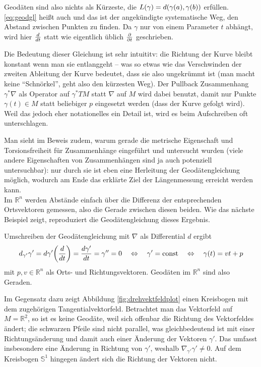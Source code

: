 Geodäten sind also nichts als Kürzeste, die $L(\gamma) = d\qty(\gamma(a), \gamma(b))$ erfüllen. \eqref{eq:geodgl} heißt auch  und das ist der angekündigte systematische Weg, den Abstand zwischen Punkten zu finden. Da $\gamma$ nur von einem Parameter $t$ abhängt, wird hier $\dv{t}$ statt wie eigentlich üblich $\pdv{t}$ geschrieben.

Die Bedeutung dieser Gleichung ist sehr intuititv: die Richtung der Kurve bleibt konstant wenn man sie entlanggeht -- was so etwas wie das Verschwinden der zweiten Ableitung der Kurve bedeutet, dass sie also ungekrümmt ist (man macht keine \enquote{Schnörkel}, geht also den kürzesten Weg). Der Pullback Zusammenhang $\gamma^*\nabla$ als Operator auf $\gamma^* TM$ statt $\nabla$ auf $M$ wird dabei benutzt, damit nur Punkte $\gamma(t) \in M$ statt beliebiger $p$ eingesetzt werden (dass der Kurve gefolgt wird). Weil das jedoch eher notationelles ein Detail ist, wird es beim Aufschreiben oft unterschlagen.

Man sieht im Beweis zudem, warum gerade die metrische Eigenschaft und Torsionsfreiheit für Zusammenhänge eingeführt und untersucht wurden (viele andere Eigenschaften von Zusammenhängen sind ja auch potenziell untersuchbar): nur durch sie ist eben eine Herleitung der Geodätengleichung möglich, wodurch am Ende das erklärte Ziel der Längenmessung erreicht werden kann.\\


Im $\mathbb{R}^n$ werden Abstände einfach über die Differenz der entsprechenden Ortsvektoren gemessen, also die Gerade zwischen diesen beiden. Wie das nächste Beispiel zeigt, reproduziert die Geodätengleichung dieses Ergebnis.

\begin{bsp}[Geraden]
Umschreiben der Geodätengleichung mit $\nabla$ als Differential $d$ ergibt
\begin{equation}
d_{\gamma'} \gamma' = d\gamma'\qty(\dv{t}) = \dv{\gamma'}{t} = \gamma'' = 0 \quad \Leftrightarrow \quad \gamma' = \text{const} \quad \Leftrightarrow \quad \gamma(t) = v t + p
\end{equation}
mit $p, v \in \mathbb{R}^n$ als Orts- und Richtungsvektoren. Geodäten im $\mathbb{R}^n$ sind also Geraden.

Im Gegensatz dazu zeigt Abbildung \ref{fig:drehvektfeldplot} einen Kreisbogen mit dem zugehörigen Tangentialvektorfeld. Betrachtet man das Vektorfeld auf $M = \mathbb{R}^2$, so ist es keine Geodäte, weil sich offenbar die Richtung des Vektorfeldes ändert; die schwarzen Pfeile sind nicht parallel, was gleichbedeutend ist mit einer Richtungsänderung und damit auch einer Änderung der Vektoren $\gamma'$. Das umfasst insbesondere eine Änderung in Richtung von $\gamma'$, weshalb $\nabla_{\gamma'} \gamma' \neq 0$. Auf dem Kreisbogen $\mathbb{S}^1$ hingegen ändert sich die Richtung der Vektoren nicht.
\end{bsp}


